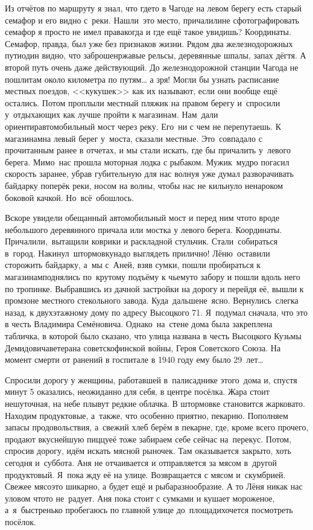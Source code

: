 Из отчётов по маршруту я знал, что где\sdash то в Чагоде на левом берегу есть старый семафор и его видно с~реки. Нашли~это место, причалили\mdash не сфотографировать семафор я просто не имел права\mdash когда и где ещё такое увидишь? Координаты. Семафор, правда, был уже без признаков жизни. Рядом два железнодорожных пути\mdash один видно, что заброшен\mdash ржавые рельсы, деревянные шпалы, запах дёгтя. А второй путь очень даже действующий. До железнодорожной станции Чагода не пошли\mdash там около километра по путям… а зря! Могли бы узнать расписание местных поездов, <<кукушек>> как их называют, если они вообще ещё остались. 
\newpage
Потом проплыли местный пляжик на правом берегу и~спросили у~отдыхающих как лучше пройти к магазинам. Нам~дали ориентир\mdash автомобильный мост через реку. Его~ни с чем не перепутаешь. К магазинам\mdash на левый берег у~моста, сказали местные. Это~совпадало с прочитанным ранее в отчетах, и мы стали искать, где бы причалить у~левого берега. Мимо~нас прошла моторная лодка с рыбаком. Мужик~мудро погасил скорость заранее, убрав губительную для нас волну\mdash я уже думал разворачивать байдарку поперёк реки, носом на волны, чтобы нас не кильнуло ненароком боковой качкой. Но~всё~обошлось. 

Вскоре увидели обещанный автомобильный мост и перед ним что\sdash то вроде небольшого деревянного причала или мостка у левого берега. Координаты. Причалили,~вытащили коврики и раскладной стульчик. Стали~собираться в~город. Накинул~штормовку\mdash надо выглядеть прилично! Лёню~оставили сторожить байдарку, а~мы с~Аней, взяв сумки, пошли пробираться к магазинам\mdash поднялись по~крутому подъёму к чьему\sdash то забору и пошли вдоль него по тропинке. Выбравшись из дачной застройки на дорогу и перейдя её, вышли к промзоне местного стекольного завода. Куда~дальше\mdash не~ясно. Вернулись~слегка назад, к двухэтажному дому по адресу Высоцкого 71. Я~подумал сначала, что это в честь Владимира Семёновича. Однако~на~стене дома была закреплена табличка, в которой было сказано, что улица названа в честь Высоцкого Кузьмы Демидовича\mdash ветерана советско\sdash финской войны, Героя Советского Союза. На момент смерти от ранений в госпитале в 1940 году ему было 29~лет\ldots 

Спросили дорогу у женщины, работавшей в~палисаднике этого~дома и, спустя минут 5 оказались, неожиданно для себя, в центре посёлка. Жара стоит нешуточная, на небе плывут редкие облачка. В штормовке становится жарковато. Находим продуктовые, а~также, что особенно приятно, пекарню. Пополняем запасы продовольствия, а~свежий хлеб берём в пекарне, где, кроме всего прочего, продают вкуснейшую пиццу\mdash её тоже забираем себе сейчас на~перекус. Потом, спросив дорогу, идём искать мясной рыночек. Там оказывается закрыто, хоть сегодня и~суббота. Аня не отчаивается и отправляется за мясом в~другой продуктовый. Я~пока жду её на улице. Возвращается с мясом и~скумбрией. Свежее мясо\mdash это шикарно, а будет ещё и рыба\mdash разнообразие. А то Лёня никак нас уловом что\sdash то не~радует. Аня пока стоит с сумками и кушает мороженое, а~я~быстренько пробегаюсь по главной улице до~площади\mdash хочется посмотреть посёлок.

